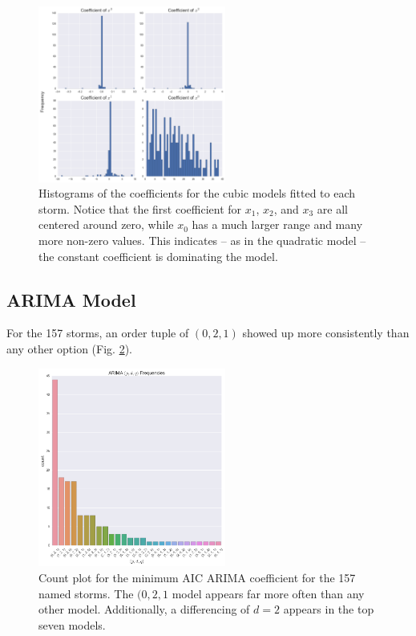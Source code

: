 \documentclass{article}
\begin{document}
	\begin{figure}[H]
			\centering
			\includegraphics[width=0.55\textwidth]{images/cubic.png}
		\caption{Histograms of the coefficients for the cubic models fitted to each storm. Notice that the first coefficient for $x_1$, $x_2$, and $x_3$ are all centered around zero, while $x_0$ has a much larger range and many more non-zero values. This indicates -- as in the quadratic model -- the constant coefficient is dominating the model.}
		\label{cubic}
	\end{figure}

	\subsection{ARIMA Model}
	For the 157 storms, an order tuple of $(0,2,1)$ showed up more consistently than any other option (Fig. \ref{arima}).
	
	\begin{figure}[t]
			\centering
			\includegraphics[width=0.55\textwidth]{images/arima.png}
		\caption{Count plot for the minimum AIC ARIMA coefficient for the 157 named storms. The $(0,2,1$ model appears far more often than any other model. Additionally, a differencing of $d = 2$ appears in the top seven models.}
		\label{arima}
	\end{figure}

	
	
	
\end{document}
